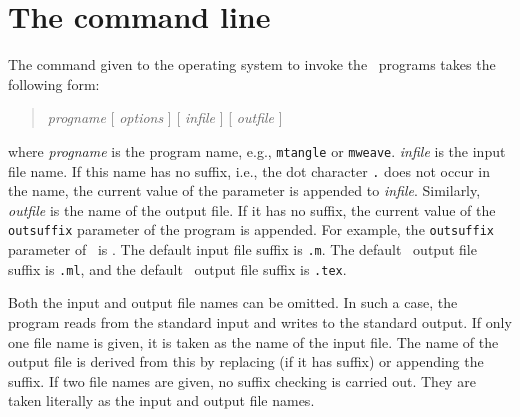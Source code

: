 \section{The command line}\label{sec-cmd-opt}

The command  given to the operating system to invoke the \mweb\
programs takes the following form:
\begin{quote}
{\it progname} [ {\it options} ] [ {\it infile\/} ] [ {\it outfile\/} ]
\end{quote}
where {\it progname\/} is the program name, e.g., {\tt mtangle} or
{\tt mweave}. {\it infile\/} is the input file name. If this name has
no suffix, i.e., the dot character \mbox{{\tt.}} does not
occur in the name, the current value of the parameter 
is appended to {\it infile\/}. Similarly, {\it outfile\/} is the name
of the output file. If it has no suffix, the current value 
of the {\tt outsuffix} parameter of the program is appended. For
example, the {\tt outsuffix} parameter of \weave\ is
. The default input file suffix is {\tt .m}. The
default \tangle\ output file suffix is {\tt .ml}, and the default
\weave\ output file suffix is {\tt .tex}.

Both the input and output file names can be omitted.  In such a case,
the program reads from the standard input and writes to the standard
output. If only one file name is given, it is taken as the name of the
input file. The name of the output file is derived from this by
replacing (if it has suffix) or appending the suffix. If two file
names are given, no suffix checking is carried out. They are taken
literally as the input and output file names.

